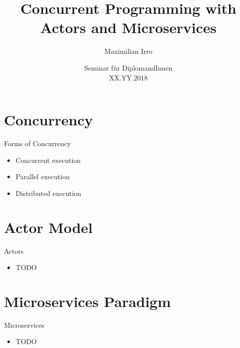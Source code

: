 \documentclass{beamer}
\title[Your Short Title]{Concurrent Programming with\\Actors and Microservices}
\author{Maximilian Irro}
\date{Seminar für DiplomandInnen\\XX.YY.2018}
\begin{document}
\begin{frame}
  \titlepage
\end{frame}


\section{Concurrency}


\begin{frame}{Forms of Concurrency}

\begin{itemize}
  \item Concurrent execution
  \item Parallel execution
  \item Distributed execution
\end{itemize}

\end{frame}


\section{Actor Model}

\begin{frame}{Actors}

\begin{itemize}
  \item TODO
\end{itemize}

\end{frame}

\section{Microservices Paradigm}

\begin{frame}{Microservices}

\begin{itemize}
  \item TODO
\end{itemize}

\end{frame}
\end{document}
